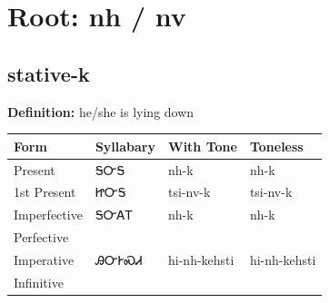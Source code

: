 \documentclass{article}%
\begin{document}
%
\normalsize%
\section*{Root: nh / nv}%
\subsection*{stative-k}%
\textbf{Definition: }%
he/she is lying down%
\\[0.5em]%
\begin{tabular}{|l|l|l|l|}%
\hline%
\textbf{Form}&\textbf{Syllabary}&\textbf{With Tone}&\textbf{Toneless}\\%
\hline%
Present&ᎦᏅᎦ&nh{-}k&nh{-}k\\%
1st Present&ᏥᏅᎦ&tsi{-}nv{-}k&tsi{-}nv{-}k\\%
Imperfective&ᎦᏅᎪᎢ&nh{-}k&nh{-}k\\%
Perfective&&&\\%
Imperative&ᎯᏅᎨᏍᏗ&hi{-}nh{-}kehsti&hi{-}nh{-}kehsti\\%
Infinitive&&&\\%
\hline%
\end{tabular}%
\\[1em]%
\end{document}
